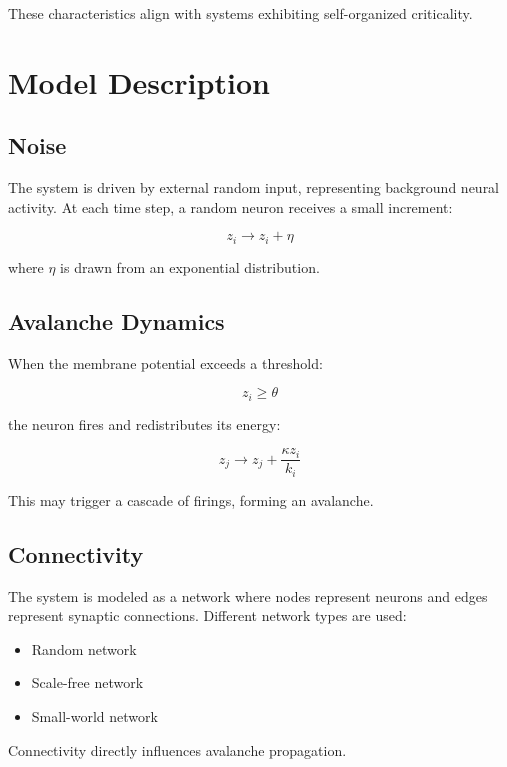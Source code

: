 \documentclass[12pt]{article}
\begin{document}
These characteristics align with systems exhibiting self-organized criticality.

\section{Model Description}

\subsection{Noise}
The system is driven by external random input, representing background neural activity. At each time step, a random neuron receives a small increment:

\begin{equation}
z_i \rightarrow z_i + \eta
\end{equation}

where $\eta$ is drawn from an exponential distribution.

\subsection{Avalanche Dynamics}
When the membrane potential exceeds a threshold:

\begin{equation}
z_i \geq \theta
\end{equation}

the neuron fires and redistributes its energy:

\begin{equation}
z_j \rightarrow z_j + \frac{\kappa z_i}{k_i}
\end{equation}

This may trigger a cascade of firings, forming an avalanche.

\subsection{Connectivity}
The system is modeled as a network where nodes represent neurons and edges represent synaptic connections. Different network types are used:

\begin{itemize}
\item Random network
\item Scale-free network
\item Small-world network
\end{itemize}

Connectivity directly influences avalanche propagation.
\end{document}
